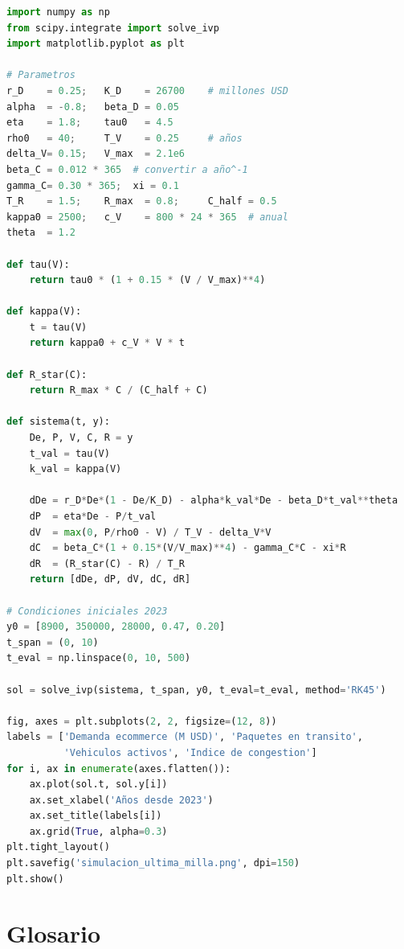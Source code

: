 \documentclass[12pt,a4paper]{article}
\begin{document}
\begin{lstlisting}[language=Python, caption={Simulación básica del
  sistema con \texttt{scipy.integrate.solve\_ivp}}]
import numpy as np
from scipy.integrate import solve_ivp
import matplotlib.pyplot as plt

# Parametros
r_D    = 0.25;   K_D    = 26700    # millones USD
alpha  = -0.8;   beta_D = 0.05
eta    = 1.8;    tau0   = 4.5
rho0   = 40;     T_V    = 0.25     # años
delta_V= 0.15;   V_max  = 2.1e6
beta_C = 0.012 * 365  # convertir a año^-1
gamma_C= 0.30 * 365;  xi = 0.1
T_R    = 1.5;    R_max  = 0.8;     C_half = 0.5
kappa0 = 2500;   c_V    = 800 * 24 * 365  # anual
theta  = 1.2

def tau(V):
    return tau0 * (1 + 0.15 * (V / V_max)**4)

def kappa(V):
    t = tau(V)
    return kappa0 + c_V * V * t

def R_star(C):
    return R_max * C / (C_half + C)

def sistema(t, y):
    De, P, V, C, R = y
    t_val = tau(V)
    k_val = kappa(V)

    dDe = r_D*De*(1 - De/K_D) - alpha*k_val*De - beta_D*t_val**theta
    dP  = eta*De - P/t_val
    dV  = max(0, P/rho0 - V) / T_V - delta_V*V
    dC  = beta_C*(1 + 0.15*(V/V_max)**4) - gamma_C*C - xi*R
    dR  = (R_star(C) - R) / T_R
    return [dDe, dP, dV, dC, dR]

# Condiciones iniciales 2023
y0 = [8900, 350000, 28000, 0.47, 0.20]
t_span = (0, 10)
t_eval = np.linspace(0, 10, 500)

sol = solve_ivp(sistema, t_span, y0, t_eval=t_eval, method='RK45')

fig, axes = plt.subplots(2, 2, figsize=(12, 8))
labels = ['Demanda ecommerce (M USD)', 'Paquetes en transito',
          'Vehiculos activos', 'Indice de congestion']
for i, ax in enumerate(axes.flatten()):
    ax.plot(sol.t, sol.y[i])
    ax.set_xlabel('Años desde 2023')
    ax.set_title(labels[i])
    ax.grid(True, alpha=0.3)
plt.tight_layout()
plt.savefig('simulacion_ultima_milla.png', dpi=150)
plt.show()
\end{lstlisting}

\section{Glosario}
\end{document}
